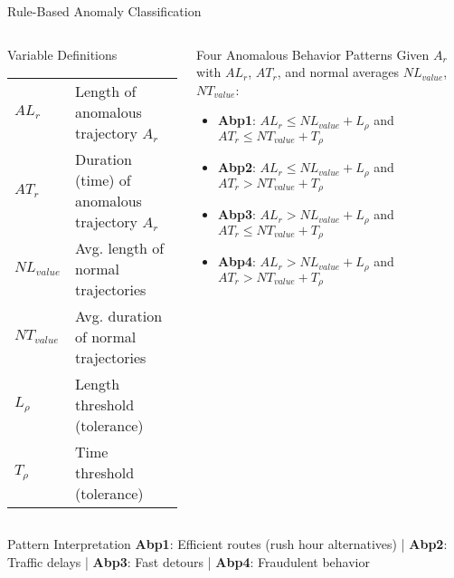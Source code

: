 \documentclass[aspectratio=169,xcolor={dvipsnames}]{beamer}
\begin{document}
\begin{frame}{Rule-Based Anomaly Classification}
  \begin{columns}[T,onlytextwidth]
    \begin{column}{0.42\textwidth}
      \begin{block}{Variable Definitions}
        \scriptsize
        \begin{tabular}{@{}l p{.65\linewidth}@{}}
          $AL_r$ & Length of anomalous trajectory $A_r$ \\
          $AT_r$ & Duration (time) of anomalous trajectory $A_r$ \\
          $NL_{value}$ & Avg. length of normal trajectories \\
          $NT_{value}$ & Avg. duration of normal trajectories \\
          $L_\rho$ & Length threshold (tolerance) \\
          $T_\rho$ & Time threshold (tolerance) \\
        \end{tabular}
      \end{block}
    \end{column}
    \begin{column}{0.48\textwidth}
      \begin{block}{Four Anomalous Behavior Patterns \cite{wangDetectingAnomalousTrajectories2018}}
        \scriptsize
        Given $A_r$ with $AL_r$, $AT_r$, and normal averages $NL_{value}$, $NT_{value}$:
        \begin{itemize}
          \item \textbf{Abp1}: $AL_r \leq NL_{value} + L_\rho$ and $AT_r \leq NT_{value} + T_\rho$
          \item \textbf{Abp2}: $AL_r \leq NL_{value} + L_\rho$ and $AT_r > NT_{value} + T_\rho$
          \item \textbf{Abp3}: $AL_r > NL_{value} + L_\rho$ and $AT_r \leq NT_{value} + T_\rho$
          \item \textbf{Abp4}: $AL_r > NL_{value} + L_\rho$ and $AT_r > NT_{value} + T_\rho$
        \end{itemize}
      \end{block}
    \end{column}
  \end{columns}
  
  \vspace{0.5em}
  \begin{alertblock}{Pattern Interpretation}
    \footnotesize
    \textbf{Abp1}: Efficient routes (rush hour alternatives) | \textbf{Abp2}: Traffic delays | \textbf{Abp3}: Fast detours | \textbf{Abp4}: Fraudulent behavior
  \end{alertblock}
\end{frame}
\end{document}
